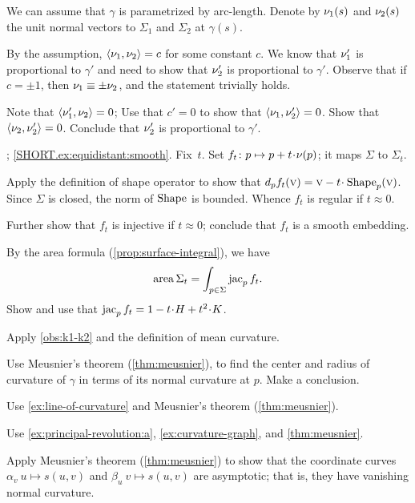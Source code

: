 \begin{multicols}{2}
We can assume that $\gamma$ is parametrized by arc-length.
Denote by $\nu_1(s)$ and $\nu_2(s)$ the unit normal vectors to $\Sigma_1$ and $\Sigma_2$ at $\gamma(s)$.

By the assumption, $\langle \nu_1,\nu_2\rangle= c$ for some constant $c$.
We know that
$\nu_1'$ is proportional to $\gamma'$ and need to show that $\nu_2'$ is proportional to $\gamma'$.
Observe that if $c=\pm1$, then $\nu_1\equiv\pm \nu_2$, and the statement trivially holds.

Note that $\langle\nu_1',\nu_2\rangle=0$;
Use that $c'=0$ to show that $\langle\nu_1,\nu_2'\rangle=0$.
Show that $\langle\nu_2,\nu_2'\rangle=0$.
Conclude that $\nu_2'$ is proportional to $\gamma'$.

\parbf{\ref{ex:equidistant}};
\ref{SHORT.ex:equidistant:smooth}.
Fix~$t$.
Set $f_t\:p\mapsto p+t\cdot\Norm(p)$; it maps $\Sigma$ to $\Sigma_t$.

Apply the definition of shape operator to show that $d_pf_t(\vec v)=\vec v-t\cdot\Shape_p(\vec v)$.
Since $\Sigma$ is closed, the norm of $\mathop{\rm Shape}\nolimits$ is bounded.
Whence $f_t$ is regular if $t\approx 0$.

Further show that $f_t$ is injective if $t\approx0$;
conclude that $f_t$ is a smooth embedding.

 By the area formula (\ref{prop:surface-integral}), we have
\[\mathop{\rm area}\nolimits\Sigma_t=\int_{p\in \Sigma}\mathop{\rm jac}\nolimits_pf_t.\]
Show and use that $\jac_pf_t=1-t\cdot H+t^2\cdot K$.

Apply \ref{obs:k1-k2} and the definition of mean curvature.

Use Meusnier's theorem (\ref{thm:meusnier}), to find the center and radius of curvature of $\gamma$ in terms of its normal curvature at $p$.
Make a conclusion.

Use \ref{ex:line-of-curvature} and Meusnier's theorem (\ref{thm:meusnier}).

Use \ref{ex:principal-revolution:a},  \ref{ex:curvature-graph}, and \ref{thm:meusnier}.

 Apply Meusnier's theorem (\ref{thm:meusnier}) to show that the coordinate curves $\alpha_v\:u\mapsto s(u,v)$ and $\beta_u\:v\mapsto s(u,v)$ are asymptotic; that is, they have vanishing normal curvature.


\end{multicols}
